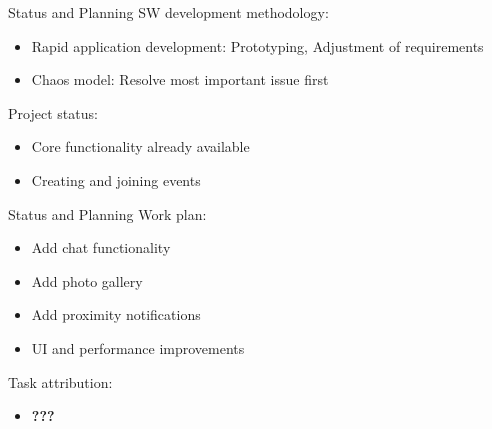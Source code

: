 \documentclass[logo=EURECOM,english]{eurecombeamer}
\newcommand{\todo}[1]{\textbf{\color{red} #1}}
\begin{document}
\begin{frame}{Status and Planning}
SW development methodology:
\begin{itemize}
\item Rapid application development: Prototyping, Adjustment of requirements
\item Chaos model: Resolve most important issue first\bigskip
\end{itemize}
Project status:
\begin{itemize}
\item Core functionality already available
\item Creating and joining events
\end{itemize}
\end{frame}

\begin{frame}{Status and Planning}
Work plan:
\begin{itemize}
\item Add chat functionality
\item Add photo gallery
\item Add proximity notifications
\item UI and performance improvements\bigskip
\end{itemize}
Task attribution:
\begin{itemize}
\item \todo{???}
\end{itemize}
\end{frame}

\begin{frame}
\end{frame}

\begin{frame}
\end{frame}
\end{document}
